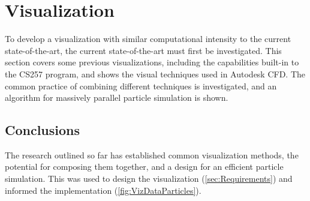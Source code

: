 



\section{Visualization}\label{sec:Research:Visualization}
To develop a visualization with similar computational intensity to the current state-of-the-art, the current state-of-the-art must first be investigated.
This section covers some previous visualizations, including the capabilities built-in to the CS257 program, and shows the visual techniques used in Autodesk CFD.
The common practice of combining different techniques is investigated, and an algorithm for massively parallel particle simulation is shown.








\subsection{Conclusions}
The research outlined so far has established common visualization methods, the potential for composing them together, and a design for an efficient particle simulation.
This was used to design the visualization (\cref{sec:Requirements}) and informed the implementation (\cref{fig:VizDataParticles}).